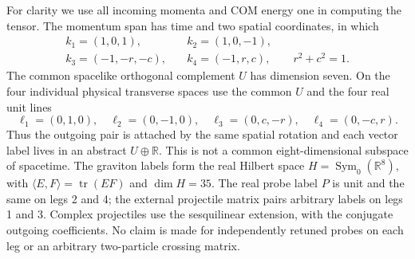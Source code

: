 \documentclass[11pt]{article}
\newcommand{\tr}{\operatorname{tr}}
\newcommand{\Sym}{\operatorname{Sym}_0}
\begin{document}
For clarity we use all incoming momenta and COM energy one in computing
the tensor. The momentum span has time and two spatial coordinates,
in which
\begin{equation}
 \begin{split}
 k_1=(1,0,1),&\quad k_2=(1,0,-1),\\
 k_3=(-1,-r,-c),&\quad k_4=(-1,r,c),\qquad r^2+c^2=1 .
 \end{split}
\end{equation}
The common spacelike orthogonal complement $U$ has dimension seven.
On the four individual physical transverse spaces use the common $U$
and the four real unit lines
\begin{equation}
 \ell_1=(0,1,0),\quad \ell_2=(0,-1,0),\quad
 \ell_3=(0,c,-r),\quad \ell_4=(0,-c,r).
 \label{eq:transport}
\end{equation}
Thus the outgoing pair is attached by the same spatial rotation and
each vector label lives in an abstract $U\oplus\mathbb R$. This is not a
common eight-dimensional subspace of spacetime. The graviton labels
form the real Hilbert space $H=\Sym(\mathbb R^8)$, with
$\langle E,F\rangle=\tr(EF)$ and $\dim H=35$. The real probe label $P$ is
unit and the same on legs 2 and 4; the external projectile matrix
pairs arbitrary labels on legs 1 and 3. Complex projectiles use the
sesquilinear extension, with the conjugate outgoing coefficients.
No claim is made for independently retuned probes on each leg or an
arbitrary two-particle crossing matrix.
\end{document}
